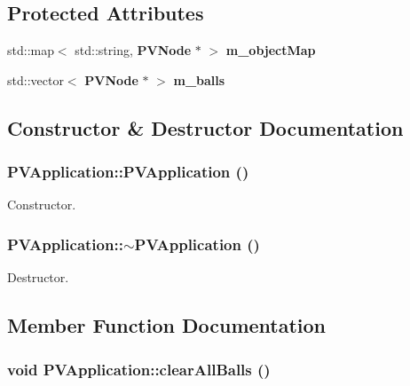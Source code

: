 \subsection*{Protected Attributes}
\begin{CompactItemize}
\item 
std::map$<$ std::string, {\bf PVNode} $\ast$ $>$ {\bf m\_\-objectMap}
\item 
std::vector$<$ {\bf PVNode} $\ast$ $>$ {\bf m\_\-balls}
\end{CompactItemize}


\subsection{Constructor \& Destructor Documentation}
\subsubsection[{PVApplication}]{\setlength{\rightskip}{0pt plus 5cm}PVApplication::PVApplication ()}\label{class_p_v_application_621fc385e12d3823366490cb93ebc9a9}


Constructor. 

\subsubsection[{$\sim$PVApplication}]{\setlength{\rightskip}{0pt plus 5cm}PVApplication::$\sim$PVApplication ()}\label{class_p_v_application_3d86091863293b76b98694cafc7d9591}


Destructor. 



\subsection{Member Function Documentation}
\subsubsection[{clearAllBalls}]{\setlength{\rightskip}{0pt plus 5cm}void PVApplication::clearAllBalls ()}\label{class_p_v_application_4e2bf04991d47db48f4b8ae7a7f261fc}


